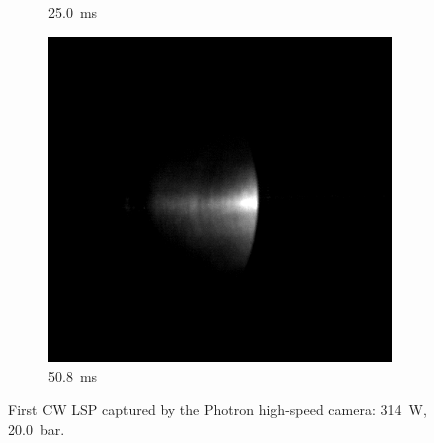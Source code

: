 \begin{figure}[!ht]
\begin{subfigure}[t]{0.3\textwidth}
        \caption{\qty{25.0}{ms}}
    \end{subfigure}
    \hfill
    \begin{subfigure}[t]{0.3\textwidth}
        \centering
        \includegraphics[width=\textwidth]{assets/4 experiments/CW LSP frames Photron/LSP385_V2_CW1_Fr508.png}
        \caption{\qty{50.8}{ms}}
    \end{subfigure}
    \caption{First CW LSP captured by the Photron high-speed camera: \qty{314}{W}, \qty{20.0}{bar}.}
    \label{fig:CW_V2_Photron_frames}
\end{figure}

